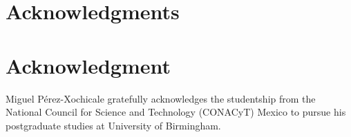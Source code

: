 \documentclass[10pt,journal,compsoc]{IEEEtran}
\begin{document}
\ifCLASSOPTIONcompsoc
  \section*{Acknowledgments}
\else
  \section*{Acknowledgment}
\fi

Miguel P\'erez-Xochicale gratefully acknowledges the studentship from 
the National Council for Science and Technology (CONACyT) Mexico
to pursue his postgraduate studies at University of Birmingham.

\ifCLASSOPTIONcaptionsoff
  \newpage
\fi





%
%
%
% 
% 





% 
\end{document}

